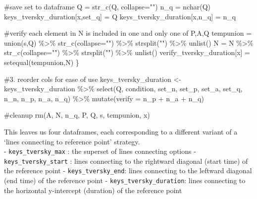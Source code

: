 \documentclass[
  letterpaper,
  DIV=11,
  numbers=noendperiod]{scrreprt}
\newenvironment{Shaded}{\begin{snugshade}}{\end{snugshade}}
\newcommand{\AttributeTok}[1]{\textcolor[rgb]{0.40,0.45,0.13}{#1}}
\newcommand{\CommentTok}[1]{\textcolor[rgb]{0.37,0.37,0.37}{#1}}
\newcommand{\FunctionTok}[1]{\textcolor[rgb]{0.28,0.35,0.67}{#1}}
\newcommand{\NormalTok}[1]{\textcolor[rgb]{0.00,0.23,0.31}{#1}}
\newcommand{\OtherTok}[1]{\textcolor[rgb]{0.00,0.23,0.31}{#1}}
\newcommand{\SpecialCharTok}[1]{\textcolor[rgb]{0.37,0.37,0.37}{#1}}
\newcommand{\StringTok}[1]{\textcolor[rgb]{0.13,0.47,0.30}{#1}}
\begin{document}
\begin{Shaded}
\begin{Highlighting}[]
  \CommentTok{\#save set to dataframe}
\NormalTok{  Q }\OtherTok{=} \FunctionTok{str\_c}\NormalTok{(Q, }\AttributeTok{collapse=}\StringTok{""}\NormalTok{)}
\NormalTok{  n\_q }\OtherTok{=} \FunctionTok{nchar}\NormalTok{(Q)}
\NormalTok{  keys\_tversky\_duration[x,}\StringTok{\textquotesingle{}set\_q\textquotesingle{}}\NormalTok{] }\OtherTok{=}\NormalTok{ Q}
\NormalTok{  keys\_tversky\_duration[x,}\StringTok{\textquotesingle{}n\_q\textquotesingle{}}\NormalTok{] }\OtherTok{=}\NormalTok{ n\_q}
  
  \CommentTok{\#verify each element in N is included in one and only one of P,A,Q}
\NormalTok{  tempunion }\OtherTok{=} \FunctionTok{union}\NormalTok{(s,Q) }\SpecialCharTok{\%\textgreater{}\%} \FunctionTok{str\_c}\NormalTok{(}\AttributeTok{collapse=}\StringTok{""}\NormalTok{) }\SpecialCharTok{\%\textgreater{}\%} \FunctionTok{strsplit}\NormalTok{(}\StringTok{""}\NormalTok{) }\SpecialCharTok{\%\textgreater{}\%} \FunctionTok{unlist}\NormalTok{()}
\NormalTok{  N }\OtherTok{=}\NormalTok{ N }\SpecialCharTok{\%\textgreater{}\%} \FunctionTok{str\_c}\NormalTok{(}\AttributeTok{collapse=}\StringTok{""}\NormalTok{) }\SpecialCharTok{\%\textgreater{}\%} \FunctionTok{strsplit}\NormalTok{(}\StringTok{""}\NormalTok{) }\SpecialCharTok{\%\textgreater{}\%} \FunctionTok{unlist}\NormalTok{()}
\NormalTok{  verify\_tversky\_duration[x] }\OtherTok{=} \FunctionTok{setequal}\NormalTok{(tempunion,N)}
\NormalTok{\}}

\CommentTok{\#3. reorder cols for ease of use}
\NormalTok{keys\_tversky\_duration }\OtherTok{\textless{}{-}}\NormalTok{ keys\_tversky\_duration }\SpecialCharTok{\%\textgreater{}\%} \FunctionTok{select}\NormalTok{(Q, condition, set\_n, set\_p, set\_a, set\_q, n\_n, n\_p, n\_a, n\_q) }\SpecialCharTok{\%\textgreater{}\%} \FunctionTok{mutate}\NormalTok{(}\AttributeTok{verify =}\NormalTok{ n\_p }\SpecialCharTok{+}\NormalTok{ n\_a }\SpecialCharTok{+}\NormalTok{ n\_q)}


\CommentTok{\#cleanup}
\FunctionTok{rm}\NormalTok{(A, N, n\_q, P, Q, s, tempunion, x)}
\end{Highlighting}
\end{Shaded}

This leaves us four dataframes, each corresponding to a different
variant of a `lines connecting to reference point' strategy.\\
- \texttt{keys\_tversky\_max} : the superset of lines connecting options
- \texttt{keys\_tversky\_start} : lines connecting to the rightward
diagonal (start time) of the reference point -
\texttt{keys\_tversky\_end}: lines connecting to the leftward diagonal
(end time) of the reference point - \texttt{keys\_tversky\_duration}:
lines connecting to the horizontal y-intercept (duration) of the
reference point
\end{document}
